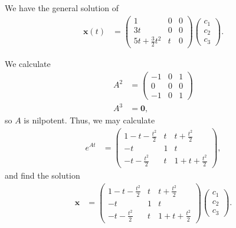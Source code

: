 \documentclass[10pt]{mypackage}
\begin{document}
\begin{solution}[8.4, Problem 8]
  We have the general solution of
  \begin{align*}
    \mathbf{x}(t) &= \begin{pmatrix}1 & 0 & 0\\ 3t & 0 & 0 \\ 5t + \frac{3}{2}t^2 & t & 0\end{pmatrix} \begin{pmatrix}c_1\\c_2\\c_3\end{pmatrix}.
  \end{align*}
\end{solution}
\begin{solution}[8.4, Problem 26]
  We calculate
  \begin{align*}
    A^2 &= \begin{pmatrix}-1 & 0 & 1 \\ 0 & 0 & 0 \\ -1 & 0 & 1\end{pmatrix}\\
    A^3 &= \mathbf{0},
  \end{align*}
  so $A$ is nilpotent. Thus, we may calculate
  \begin{align*}
    e^{At} &= \begin{pmatrix}1 - t - \frac{t^2}{2} & t & t + \frac{t^2}{2}\\ -t & 1 & t \\ -t-\frac{t^2}{2} & t & 1 + t + \frac{t^2}{2}\end{pmatrix},
  \end{align*}
  and find the solution
  \begin{align*}
    \mathbf{x} &= \begin{pmatrix}1 - t - \frac{t^2}{2} & t & t + \frac{t^2}{2}\\ -t & 1 & t \\ -t-\frac{t^2}{2} & t & 1 + t + \frac{t^2}{2}\end{pmatrix} \begin{pmatrix}c_1\\c_2\\c_3\end{pmatrix}.
  \end{align*}
\end{solution}
\end{document}

